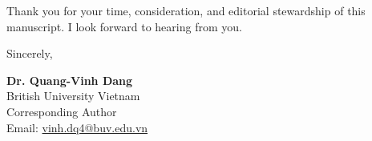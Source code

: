 \documentclass[11pt,a4paper]{article}
\begin{document}
Thank you for your time, consideration, and editorial stewardship of this manuscript. I look forward to hearing from you.

\vspace{1em}
Sincerely,

\vspace{0.8em}
\textbf{Dr. Quang-Vinh Dang} \\
British University Vietnam \\
Corresponding Author \\
Email: \href{mailto:vinh.dq4@buv.edu.vn}{vinh.dq4@buv.edu.vn}
\end{document}

